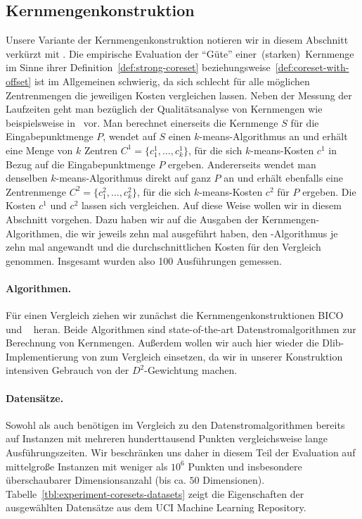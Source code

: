 \subsection{Kernmengenkonstruktion}
\label{subsection:experiment-coreset}

Unsere Variante der Kernmengenkonstruktion notieren wir in diesem Abschnitt verkürzt mit \CsTwo. Die empirische Evaluation
der "`Güte"' einer~(starken)~Kernmenge im Sinne ihrer Definition~\ref{def:strong-coreset}
beziehungsweise~\ref{def:coreset-with-offset} ist im Allgemeinen schwierig, da sich schlecht für alle möglichen Zentrenmengen
die jeweiligen Kosten vergleichen lassen. Neben der Messung der Laufzeiten geht man bezüglich der Qualitätsanalyse von Kernmengen
wie beispielsweise in~\cite{AckermannMRSLS12,FichtenbergerGSSS13} vor. Man berechnet einerseits die Kernmenge $S$ für die
Eingabepunktmenge $P$, wendet auf $S$ einen $k$-means-Algorithmus an und erhält eine Menge von $k$ Zentren
$C^1 = \{c_1^1, \dots, c_k^1\}$, für die sich $k$-means-Kosten $c^1$ in Bezug auf die Eingabepunktmenge $P$ ergeben.
Andererseits wendet man denselben $k$-means-Algorithmus direkt auf ganz $P$ an und erhält ebenfalls eine Zentrenmenge
$C^2 = \{c_1^2, \dots, c_k^2\}$, für die sich $k$-means-Kosten $c^2$ für $P$ ergeben. Die Kosten $c^1$ und $c^2$ lassen sich
vergleichen. Auf diese Weise wollen wir in diesem Abschnitt vorgehen. Dazu haben wir auf die Ausgaben der Kernmengen-Algorithmen,
die wir jeweils zehn mal ausgeführt haben,
den \kmpp-Algorithmus je zehn mal angewandt und die durchschnittlichen Kosten für den Vergleich
genommen. Insgesamt wurden also 100 Ausführungen gemessen.
\paragraph{Algorithmen.} Für einen Vergleich ziehen wir zunächst die Kernmengenkonstruktionen BICO~\cite{FichtenbergerGSSS13}
und \Skmpp~\cite{AckermannMRSLS12} heran. Beide Algorithmen sind state-of-the-art Datenstromalgorithmen zur Berechnung von
Kernmengen. Außerdem wollen wir auch hier wieder die Dlib-Implementierung von \kmpp{} zum Vergleich einsetzen, da wir in
unserer Konstruktion intensiven Gebrauch von der $D^2$-Gewichtung machen.
\paragraph{Datensätze.} Sowohl \kmpp{} als auch \CsTwo{} benötigen im Vergleich zu den Datenstromalgorithmen bereits auf Instanzen
mit mehreren hunderttausend Punkten vergleichsweise lange Ausführungszeiten. Wir beschränken uns daher in diesem Teil der
Evaluation auf mittelgroße Instanzen mit weniger als $10^6$ Punkten und insbesondere überschaubarer Dimensionsanzahl (bis
ca. $50$ Dimensionen). Tabelle~\ref{tbl:experiment-coresets-datasets} zeigt die Eigenschaften der ausgewählten Datensätze aus dem
UCI Machine Learning Repository.
